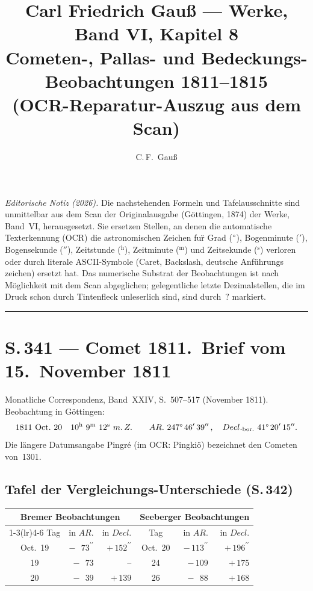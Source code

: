 \documentclass[11pt,a4paper]{article}
\title{Carl Friedrich Gau\ss{} --- Werke, Band VI, Kapitel 8\\[3pt]
\large Cometen-, Pallas- und Bedeckungs-Beobachtungen 1811--1815\\[2pt]
\normalsize (OCR-Reparatur-Auszug aus dem Scan)}
\author{C.\,F.\ Gau\ss}
\date{}
\newcommand{\h}{^{\mathrm{h}}}
\newcommand{\m}{^{\mathrm{m}}}
\newcommand{\s}{^{\mathrm{s}}}
\newcommand{\arcmin}{^{\prime}}
\newcommand{\arcsec}{^{\prime\prime}}
\newcommand{\mZ}{m.\,Z.}                            %
\newcommand{\AR}{AR.}
\newcommand{\Decl}{Decl.}
\begin{document}
\maketitle

\noindent
\textit{Editorische Notiz (2026).}
Die nachstehenden Formeln und Tafelausschnitte sind unmittelbar aus dem Scan der
Originalausgabe (G\"ottingen, 1874) der Werke, Band~VI, herausgesetzt. Sie ersetzen
Stellen, an denen die automatische Texterkennung (OCR) die astronomischen Zeichen
fu\"r Grad ($\degree$), Bogenminute ($'$), Bogensekunde ($''$), Zeitstunde
($^{\mathrm{h}}$), Zeitminute ($^{\mathrm{m}}$) und Zeitsekunde ($^{\mathrm{s}}$)
verloren oder durch literale ASCII-Symbole (Caret, Backslash, deutsche Anf\"uhrungs%
zeichen) ersetzt hat. Das numerische Substrat der Beobachtungen ist nach M\"oglichkeit
mit dem Scan abgeglichen; gelegentliche letzte Dezimalstellen, die im Druck schon
durch Tintenfleck unleserlich sind, sind durch~$?$ markiert.

\bigskip
\hrule
\bigskip


\section*{S.\,341 --- Comet 1811.\ Brief vom 15.~November 1811}

Monatliche Correspondenz, Band~XXIV, S.~507--517 (November 1811).
Beobachtung in G\"ottingen:
\[
\text{1811 Oct.\ 20}\quad
10\h\ 9\m\ 12\s\ \mZ\qquad
\AR\ 247\degree\,46\arcmin\,39\arcsec\,,\quad
\Decl_{\text{bor.}}\ 41\degree\,20\arcmin\,15\arcsec.
\]
Die l\"angere Datumsangabe \glqq Pingr\'e\grqq{} (im OCR: \glqq Pingki\"o\grqq)
bezeichnet den Cometen von~1301.

\subsection*{Tafel der Vergleichungs-Unterschiede (S.\,342)}

\begin{center}
\begin{tabular}{c r r c r r}
\toprule
\multicolumn{3}{c}{Bremer Beobachtungen} & \multicolumn{3}{c}{Seeberger Beobachtungen} \\
\cmidrule(lr){1-3}\cmidrule(lr){4-6}
Tag & in $\AR$ & in $\Decl$ & Tag & in $\AR$ & in $\Decl$ \\
\midrule
Oct.\ 19 & $-\,\phantom{0}73\arcsec$ & $+\,152\arcsec$ & Oct.\ 20 & $-\,113\arcsec$ & $+\,196\arcsec$ \\
\phantom{Oct.\ }19 & $-\,\phantom{0}73$ & --              &      24  & $-\,109$ & $+\,175$ \\
\phantom{Oct.\ }20 & $-\,\phantom{0}39$ & $+\,139$        &      26  & $-\,\phantom{0}88$ & $+\,168$ \\
\bottomrule
\end{tabular}
\end{center}
\end{document}
